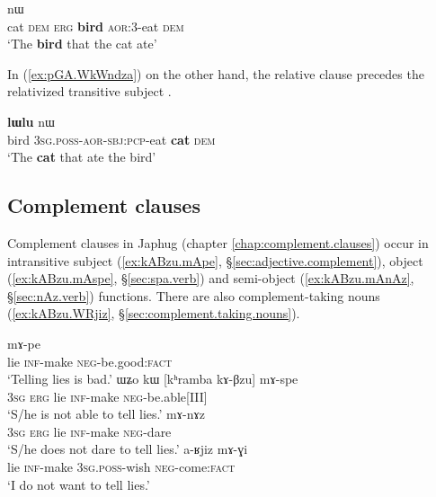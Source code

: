 \begin{exe}
\ex \label{ex:lWlu.nW.kW.tAkAndza}
 nɯ  \\
cat \textsc{dem} \textsc{erg} \textbf{bird} \textsc{aor}:3\flobv{}-eat \textsc{dem}   \\
\glt `The \textbf{bird} that the cat ate' 
\end{exe}

In (\ref{ex:pGA.WkWndza}) on the other hand, the relative clause precedes the relativized transitive subject .

\begin{exe}
\ex \label{ex:pGA.WkWndza}
 \textbf{lɯlu} nɯ   \\
bird \textsc{3sg}.\textsc{poss}-\textsc{aor}-\textsc{sbj}:\textsc{pcp}-eat \textbf{cat} \textsc{dem}  \\
\glt `The \textbf{cat} that ate the bird' 
\end{exe}

\subsection{Complement clauses}
Complement clauses in Japhug (chapter \ref{chap:complement.clauses}) occur in intransitive subject (\ref{ex:kABzu.mApe}, §\ref{sec:adjective.complement}), object (\ref{ex:kABzu.mAspe}, §\ref{sec:spa.verb}) and semi-object (\ref{ex:kABzu.mAnAz}, §\ref{sec:nAz.verb}) functions. There are also com\-ple\-ment-taking nouns (\ref{ex:kABzu.WRjiz}, §\ref{sec:complement.taking.nouns}).

\begin{exe} 
\ex \label{ex:kABzu.complements}
\begin{xlist}
\ex \label{ex:kABzu.mApe}
 mɤ-pe \\
lie \textsc{inf}-make \textsc{neg}-be.good:\textsc{fact} \\
\glt `Telling lies is bad.' 
\ex \label{ex:kABzu.mAspe}
\gll ɯʑo kɯ [kʰramba kɤ-βzu] mɤ-spe \\
\textsc{3sg} \textsc{erg} lie \textsc{inf}-make \textsc{neg}-be.able[III] \\
\glt `S/he is not able to tell lies.' 
\ex \label{ex:kABzu.mAnAz}
 mɤ-nɤz \\
\textsc{3sg} \textsc{erg} lie \textsc{inf}-make \textsc{neg}-dare \\
\glt `S/he does not dare to tell lies.' 
\ex \label{ex:kABzu.WRjiz}
 a-ʁjiz mɤ-ɣi \\
lie \textsc{inf}-make \textsc{3sg}.\textsc{poss}-wish \textsc{neg}-come:\textsc{fact} \\
\glt `I do not want to tell lies.' 
\end{xlist}
\end{exe} 

